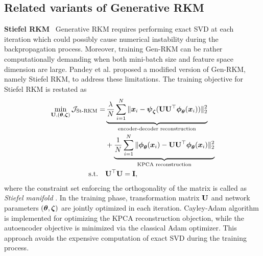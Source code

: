 \subsection{Related variants of Generative RKM}
\label{subsec-relatedvariantsofgenrkm}
\noindent\textbf{Stiefel RKM} \ Generative RKM requires performing exact SVD at each iteration which could possibly cause numerical instability during the backpropagation process. Moreover, training Gen-RKM can be rather computationally demanding when both mini-batch size and feature space dimension are large. Pandey et al. \cite{pandeyDisentangledRepresentationLearning2022} proposed a modified version of Gen-RKM, namely Stiefel RKM, to address these limitations. The training objective for Stiefel RKM is restated as
\begin{equation}
    \begin{aligned}
        \min_{\mathbf{U},(\boldsymbol{\theta},\boldsymbol{\zeta})} \mathcal{J}_{\text{St-RKM}} = &\underbrace{\frac{\lambda}{N}\sum_{i=1}^{N}\|\boldsymbol{x}_i - \boldsymbol{\psi}_{\boldsymbol{\zeta}}(\mathbf{U}\mathbf{U}^\top\boldsymbol{\phi}_{\boldsymbol{\theta}}(\boldsymbol{x}_i)) \|^2_2}_{\text{encoder-decoder reconstruction}}  \\
        & + \underbrace{\frac{1}{N}\sum_{i=1}^{N}\| \boldsymbol{\phi}_{\boldsymbol{\theta}}(\boldsymbol{x}_i) - \mathbf{U}\mathbf{U}^{\top}\boldsymbol{\phi}_{\boldsymbol{\theta}}(\boldsymbol{x}_i) \|_2^2}_{\text{KPCA reconstruction}} \\
        \text{s.t.} \quad & \mathbf{U}^\top \mathbf{U} = \mathbf{I},
    \end{aligned}
\end{equation}
where the constraint set enforcing the orthogonality of the matrix is called as \emph{Stiefel manifold} \cite{tagareNotesOptimizationStiefel2011}. In the training phase, transformation matrix $\mathbf{U}$ and network parameters $(\boldsymbol{\theta},\boldsymbol{\zeta})$ are jointly optimized in each iteration. Cayley-Adam algorithm \cite{liEfficientRiemannianOptimization2020} is implemented for optimizing the KPCA reconstruction objection, while the autoencoder objective is minimized via the classical Adam optimizer. This approach avoids the expensive computation of exact SVD during the training process.

